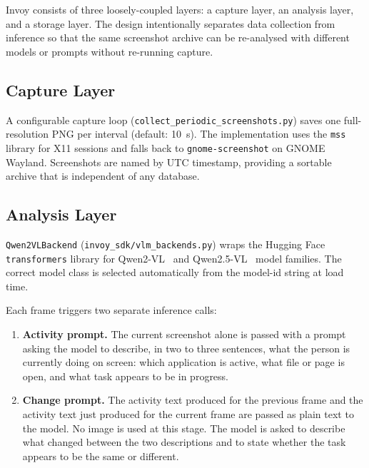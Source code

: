 \documentclass[10pt, twocolumn]{article}
\begin{document}
Invoy consists of three loosely-coupled layers: a capture layer, an analysis layer, and
a storage layer. The design intentionally separates data collection from inference so
that the same screenshot archive can be re-analysed with different models or prompts
without re-running capture.

\subsection{Capture Layer}

A configurable capture loop (\texttt{collect\_periodic\_screenshots.py}) saves one
full-resolution PNG per interval (default: 10~s). The implementation uses the
\texttt{mss} library for X11 sessions and falls back to \texttt{gnome-screenshot} on
GNOME Wayland. Screenshots are named by UTC timestamp, providing a sortable archive
that is independent of any database.

\subsection{Analysis Layer}

\texttt{Qwen2VLBackend} (\texttt{invoy\_sdk/vlm\_backends.py}) wraps the Hugging Face
\texttt{transformers} library for Qwen2-VL~\cite{wang2024qwen2vl} and
Qwen2.5-VL~\cite{qwen25vl2025} model families. The correct model class is selected
automatically from the model-id string at load time.

Each frame triggers two separate inference calls:
\begin{enumerate}
  \item \textbf{Activity prompt.} The current screenshot alone is passed with a prompt
        asking the model to describe, in two to three sentences, what the person is
        currently doing on screen: which application is active, what file or page is
        open, and what task appears to be in progress.
  \item \textbf{Change prompt.} The activity text produced for the previous frame and the
        activity text just produced for the current frame are passed as plain text to the
        model. No image is used at this stage. The model is asked to describe what changed
        between the two descriptions and to state whether the task appears to be the same
        or different.
\end{enumerate}
\end{document}
